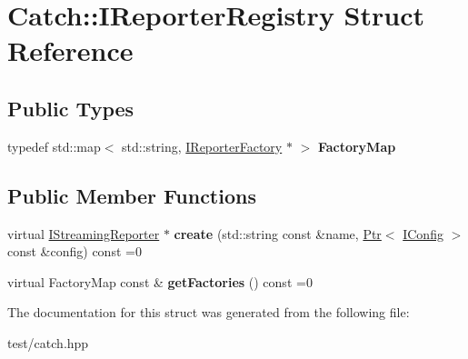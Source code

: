 \hypertarget{structCatch_1_1IReporterRegistry}{}\section{Catch\+:\+:I\+Reporter\+Registry Struct Reference}
\label{structCatch_1_1IReporterRegistry}
\subsection*{Public Types}
\begin{DoxyCompactItemize}
\item 
typedef std\+::map$<$ std\+::string, \hyperlink{structCatch_1_1IReporterFactory}{I\+Reporter\+Factory} $\ast$ $>$ {\bfseries Factory\+Map}\hypertarget{structCatch_1_1IReporterRegistry_a328440adc2303a1e31bdc763f0504452}{}\label{structCatch_1_1IReporterRegistry_a328440adc2303a1e31bdc763f0504452}

\end{DoxyCompactItemize}
\subsection*{Public Member Functions}
\begin{DoxyCompactItemize}
\item 
virtual \hyperlink{structCatch_1_1IStreamingReporter}{I\+Streaming\+Reporter} $\ast$ {\bfseries create} (std\+::string const \&name, \hyperlink{classCatch_1_1Ptr}{Ptr}$<$ \hyperlink{structCatch_1_1IConfig}{I\+Config} $>$ const \&config) const =0\hypertarget{structCatch_1_1IReporterRegistry_aa755ff8c6f1d29aaf43e0127c70e85d0}{}\label{structCatch_1_1IReporterRegistry_aa755ff8c6f1d29aaf43e0127c70e85d0}

\item 
virtual Factory\+Map const \& {\bfseries get\+Factories} () const =0\hypertarget{structCatch_1_1IReporterRegistry_a76ffc8a26c38929f370196937ed112b5}{}\label{structCatch_1_1IReporterRegistry_a76ffc8a26c38929f370196937ed112b5}

\end{DoxyCompactItemize}


The documentation for this struct was generated from the following file\+:\begin{DoxyCompactItemize}
\item 
test/catch.\+hpp\end{DoxyCompactItemize}
